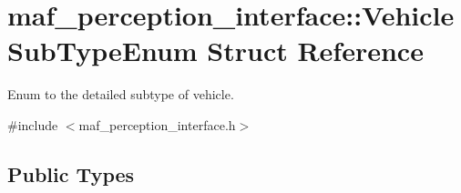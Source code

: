 \hypertarget{structmaf__perception__interface_1_1VehicleSubTypeEnum}{}\section{maf\+\_\+perception\+\_\+interface\+:\+:Vehicle\+Sub\+Type\+Enum Struct Reference}
\label{structmaf__perception__interface_1_1VehicleSubTypeEnum}


Enum to the detailed subtype of vehicle.  




{\ttfamily \#include $<$maf\+\_\+perception\+\_\+interface.\+h$>$}

\subsection*{Public Types}
